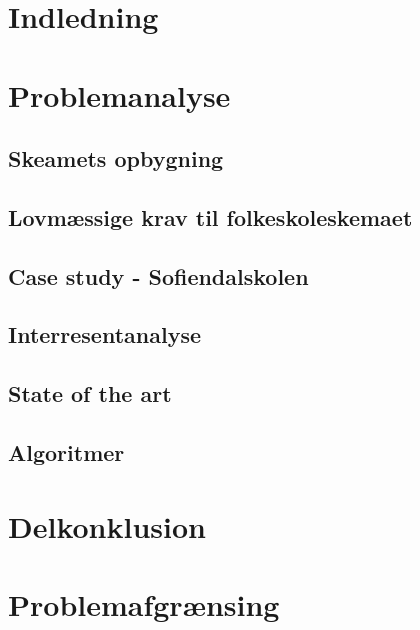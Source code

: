 \section{Indledning}
  

\newpage
\section{Problemanalyse}
  

  \subsection{Skeamets opbygning}
    

  \subsection{Lovmæssige krav til folkeskoleskemaet}
    

  \subsection{Case study - Sofiendalskolen}
    

  \subsection{Interresentanalyse}
    

  \subsection{State of the art}
    

  \subsection {Algoritmer}
    

\section{Delkonklusion}
    

\newpage
\section{Problemafgrænsing}
    

